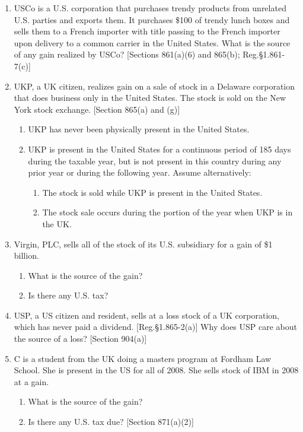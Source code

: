 	\begin{select}
	
	\begin{enumerate}
	
		\item USCo is a U.S. corporation that purchases trendy products from unrelated U.S. parties and exports them.  It purchases \$100 of trendy lunch boxes and sells them to a French importer with title passing to the French importer upon delivery to a common carrier in the United States.  What is the source of any gain realized by USCo?  [Sections 861(a)(6) and 865(b); Reg.\@ \S 1.861-7(c)]
		\item UKP, a UK citizen, realizes gain on a sale of stock in a Delaware corporation that does business only in the United States.  The stock is sold on the New York stock exchange. [Section 865(a) and (g)]
			\begin{enumerate}
				\item UKP has never been physically present in the United States.
				\item UKP is present in the United States for a continuous period of 185 days during the taxable year, but is not present in this country during any prior year or during the following year.  Assume alternatively:
					\begin{enumerate}
						\item The stock is sold while UKP is present in the United States.
						\item The stock sale occurs during the portion of the year when UKP is in the UK.
					\end{enumerate}
				\end{enumerate}
				
		\item Virgin, PLC, sells all of the stock of its U.S. subsidiary for a gain of \$1 billion.  
				\begin{enumerate}
					\item  What is the source of the gain?
					\item Is there any U.S. tax?
				\end{enumerate}
							
		\item USP, a US citizen and resident, sells at a loss stock of a UK corporation, which has never paid a dividend. [Reg.\@ \S 1.865-2(a)]  Why does USP care about the source of a loss?  [Section 904(a)]
		
		\item C is a student from the UK doing a masters program at Fordham Law School.  She is present in the US for all of 2008.  She sells stock of IBM in 2008 at a gain.  
			\begin{enumerate}  
				\item What is the source of the gain?
				\item Is there any U.S. tax due?	[Section 871(a)(2)]
			\end{enumerate} 
	

\end{enumerate}
\end{select}
